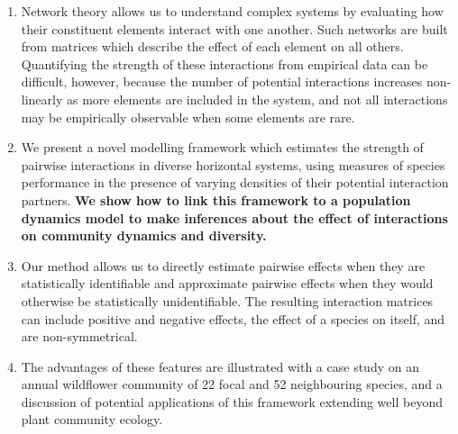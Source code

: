 \documentclass[a4,12pt]{article}
\begin{document}
    \begin{enumerate}
    \item{Network theory allows us to understand complex systems by evaluating how their constituent elements interact with one another. Such networks are built from matrices which describe the effect of each element on all others. Quantifying the strength of these interactions from empirical data can be difficult, however, because the number of potential interactions increases non-linearly as more elements are included in the system, and not all interactions may be empirically observable when some elements are rare.}
    \item{We present a novel modelling framework which estimates the strength of pairwise interactions in diverse horizontal systems, using measures of species performance in the presence of varying densities of their potential interaction partners. \textbf{We show how to link this framework to a population dynamics model to make inferences about the effect of interactions on community dynamics and diversity.}}
    \item{Our method allows us to directly estimate pairwise effects when they are statistically identifiable and approximate pairwise effects when they would otherwise be statistically unidentifiable. The resulting interaction matrices can include positive and negative effects, the effect of a species on itself, and are non-symmetrical.} 
    \item{The advantages of these features are illustrated with a case study on an annual wildflower community of 22 focal and 52 neighbouring species, and a discussion of potential applications of this framework extending well beyond plant community ecology.}
\end{enumerate}
\end{document}
